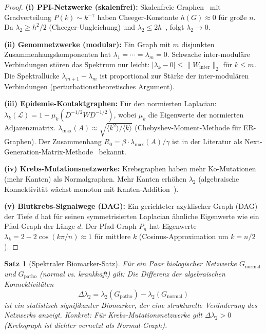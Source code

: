 ﻿\documentclass[a4paper,12pt]{article}
\theoremstyle{plain}
\newtheorem{satz}{Satz}
\theoremstyle{definition}
\theoremstyle{remark}
\begin{document}
\begin{proof}
\textbf{(i) PPI-Netzwerke (skalenfrei):}
Skalenfreie Graphen~\cite{barabasi2004} mit Gradverteilung $P(k) \sim k^{-\gamma}$
haben Cheeger-Konstante $h(G) \approx 0$ f\"ur gro{\ss}e $n$.
Da $\lambda_2 \geq h^2/2$ (Cheeger-Ungleichung) und
$\lambda_2 \leq 2h$~\cite{chung1997}, folgt $\lambda_2 \to 0$.

\textbf{(ii) Genomnetzwerke (modular):}
Ein Graph mit $m$ disjunkten Zusammenhangskomponenten hat
$\lambda_1 = \cdots = \lambda_m = 0$.
Schwache inter-modul\"are Verbindungen st\"oren das Spektrum nur leicht:
$|\lambda_k - 0| \leq \|W_{\mathrm{inter}}\|_2$ f\"ur $k \leq m$.
Die Spektrall\"ucke $\lambda_{m+1} - \lambda_m$ ist proportional zur
St\"arke der inter-modul\"aren Verbindungen (perturbationstheoretisches
Argument).

\textbf{(iii) Epidemie-Kontaktgraphen:}
F\"ur den normierten Laplacian: $\lambda_k(\mathcal{L}) = 1 - \mu_k(D^{-1/2}WD^{-1/2})$,
wobei $\mu_k$ die Eigenwerte der normierten Adjazenzmatrix.
$\lambda_{\max}(A) \approx \sqrt{\langle k^2 \rangle / \langle k \rangle}$
(Chebyshev-Moment-Methode f\"ur ER-Graphen).
Der Zusammenhang $R_0 = \beta \cdot \lambda_{\max}(A)/\gamma$ ist in
der Literatur als Next-Generation-Matrix-Methode~\cite{diekmann1990}
bekannt.

\textbf{(iv) Krebs-Mutationsnetzwerke:}
Krebsgraphen haben mehr Ko-Mutationen (mehr Kanten) als Normalgraphen.
Mehr Kanten erh\"ohen $\lambda_2$ (algebraische Konnektivit\"at w\"achst
monoton mit Kanten-Addition~\cite{fiedler1973}).

\textbf{(v) Blutkrebs-Signalwege (DAG):}
Ein gerichteter azyklischer Graph (DAG) der Tiefe $d$ hat
f\"ur seinen symmetrisierten Laplacian \"ahnliche Eigenwerte wie
ein Pfad-Graph der L\"ange $d$.
Der Pfad-Graph $P_n$ hat Eigenwerte $\lambda_k = 2 - 2\cos(k\pi/n) \approx 1$
f\"ur mittlere $k$ (Cosinus-Approximation um $k = n/2$).
\end{proof}

\begin{satz}[Spektraler Biomarker-Satz]
\label{satz:spektral_biomarker}
F\"ur ein Paar biologischer Netzwerke $G_{\mathrm{normal}}$ und
$G_{\mathrm{patho}}$ (normal vs. krankhaft) gilt:
Die Differenz der algebraischen Konnektivit\"aten
\[
\Delta\lambda_2 = \lambda_2(G_{\mathrm{patho}}) - \lambda_2(G_{\mathrm{normal}})
\]
ist ein statistisch signifikanter Biomarker, der eine strukturelle
Ver\"anderung des Netzwerks anzeigt.
Konkret: F\"ur Krebs-Mutationsnetzwerke gilt $\Delta\lambda_2 > 0$
(Krebsgraph ist dichter vernetzt als Normal-Graph).
\end{satz}
\end{document}
